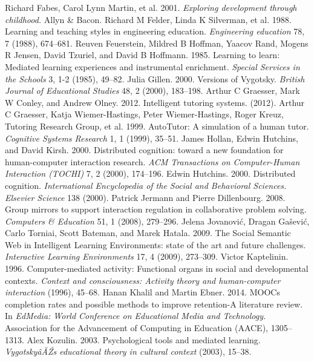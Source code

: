 \begin{multicols}{2}
\begin{thebibliography}{99}
 Richard Fabes, Carol Lynn Martin, et al. 2001. \textit{Exploring development through childhood.} Allyn \& Bacon.
 Richard M Felder, Linda K Silverman, et al. 1988. Learning and teaching styles in engineering education. \textit{Engineering education} 78, 7 (1988), 674–681.
 Reuven Feuerstein, Mildred B Hoffman, Yaacov Rand, Mogens R Jensen, David Tzuriel, and David B Hoffmann. 1985. Learning to learn: Mediated learning experiences and instrumental enrichment. \textit{Special Services in the Schools} 3, 1-2 (1985), 49–82.
 Julia Gillen. 2000. Versions of Vygotsky. \textit{British Journal of Educational Studies} 48, 2 (2000), 183–198.
 Arthur C Graesser, Mark W Conley, and Andrew Olney. 2012. Intelligent tutoring systems. (2012).
 Arthur C Graesser, Katja Wiemer-Hastings, Peter Wiemer-Hastings, Roger Kreuz, Tutoring Research Group, et al. 1999. AutoTutor: A simulation of a human tutor. \textit{Cognitive Systems Research} 1, 1 (1999), 35–51.
 James Hollan, Edwin Hutchins, and David Kirsh. 2000. Distributed cognition: toward a new foundation for human-computer interaction research. \textit{ACM Transactions on Computer-Human Interaction (TOCHI)} 7, 2 (2000), 174–196.
 Edwin Hutchins. 2000. Distributed cognition. \textit{International Encyclopedia of the Social and Behavioral Sciences. Elsevier Science} 138 (2000).
 Patrick Jermann and Pierre Dillenbourg. 2008. Group mirrors to support interaction regulation in collaborative problem solving. \textit{Computers \& Education} 51, 1 (2008), 279–296.
 Jelena Jovanović, Dragan Gašević, Carlo Torniai, Scott Bateman, and Marek Hatala. 2009. The Social Semantic Web in Intelligent Learning Environments: state of the art and future challenges. \textit{Interactive Learning Environments} 17, 4 (2009), 273–309.
 Victor Kaptelinin. 1996. Computer-mediated activity: Functional organs in social and developmental contexts. \textit{Context and consciousness: Activity theory and human-computer interaction} (1996), 45–68.
 Hanan Khalil and Martin Ebner. 2014. MOOCs completion rates and possible methods to improve retention-A literature review. In \textit{EdMedia: World Conference on Educational Media and Technology.} Association for the Advancement of Computing in Education (AACE), 1305–1313.
 Alex Kozulin. 2003. Psychological tools and mediated learning. \textit{VygotskyâĂŹs educational theory in cultural context} (2003), 15–38.

\end{thebibliography}
\end{multicols}
